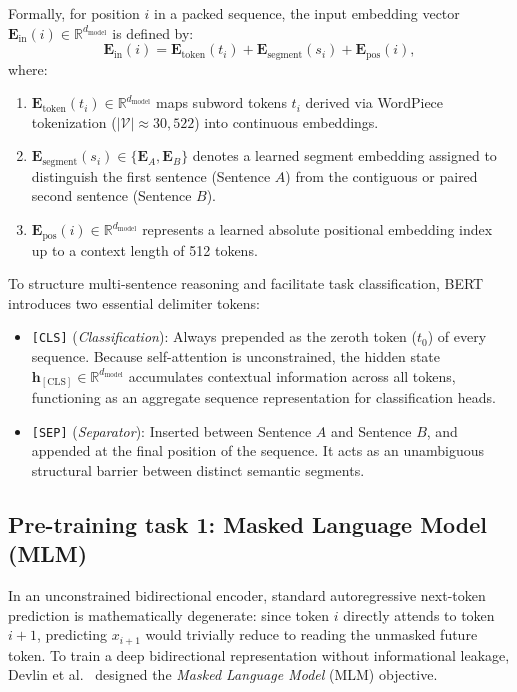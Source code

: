 \documentclass[../../main.tex]{subfiles}
\begin{document}
Formally, for position $i$ in a packed sequence, the input embedding vector $\mathbf{E}_{\text{in}}(i) \in \mathbb{R}^{d_{\text{model}}}$ is defined by:
\begin{equation}
\mathbf{E}_{\text{in}}(i) = \mathbf{E}_{\text{token}}(t_i) + \mathbf{E}_{\text{segment}}(s_i) + \mathbf{E}_{\text{pos}}(i),
\label{eq:bert_input_embedding_sum}
\end{equation}
where:
\begin{enumerate}
    \item $\mathbf{E}_{\text{token}}(t_i) \in \mathbb{R}^{d_{\text{model}}}$ maps subword tokens $t_i$ derived via WordPiece tokenization ($|\mathcal{V}| \approx 30,522$) into continuous embeddings.
    \item $\mathbf{E}_{\text{segment}}(s_i) \in \{\mathbf{E}_A, \mathbf{E}_B\}$ denotes a learned segment embedding assigned to distinguish the first sentence (Sentence $A$) from the contiguous or paired second sentence (Sentence $B$).
    \item $\mathbf{E}_{\text{pos}}(i) \in \mathbb{R}^{d_{\text{model}}}$ represents a learned absolute positional embedding index up to a context length of 512 tokens.
\end{enumerate}

To structure multi-sentence reasoning and facilitate task classification, BERT introduces two essential delimiter tokens:
\begin{itemize}
    \item \texttt{[CLS]} (\emph{Classification}): Always prepended as the zeroth token ($t_0$) of every sequence. Because self-attention is unconstrained, the hidden state $\mathbf{h}_{[\text{CLS}]} \in \mathbb{R}^{d_{\text{model}}}$ accumulates contextual information across all tokens, functioning as an aggregate sequence representation for classification heads.
    \item \texttt{[SEP]} (\emph{Separator}): Inserted between Sentence $A$ and Sentence $B$, and appended at the final position of the sequence. It acts as an unambiguous structural barrier between distinct semantic segments.
\end{itemize}


\subsection{Pre-training task 1: Masked Language Model (MLM)}
\label{subsec:bert_masked_lm}

In an unconstrained bidirectional encoder, standard autoregressive next-token prediction is mathematically degenerate: since token $i$ directly attends to token $i+1$, predicting $x_{i+1}$ would trivially reduce to reading the unmasked future token. To train a deep bidirectional representation without informational leakage, Devlin et al.~\cite{devlin2019} designed the \emph{Masked Language Model} (MLM) objective.
\end{document}
